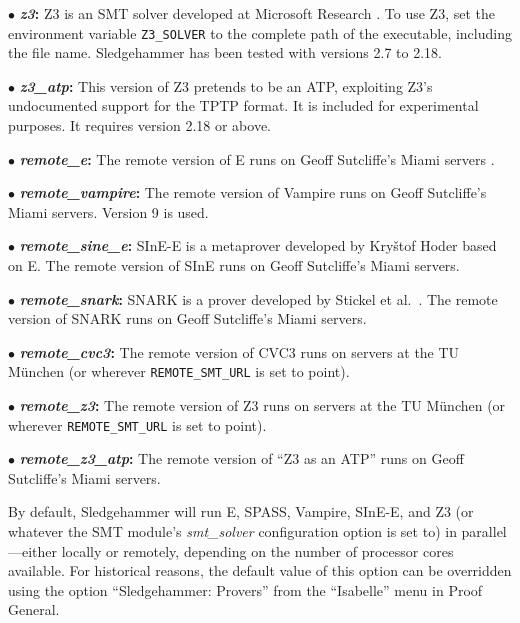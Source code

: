 \documentclass[a4paper,12pt]{article}
\begin{document}
\begin{enum}
\begin{enum}
\item[$\bullet$] \textbf{\textit{z3}:} Z3 is an SMT solver developed at
Microsoft Research \cite{z3}. To use Z3, set the environment variable
\texttt{Z3\_SOLVER} to the complete path of the executable, including the file
name. Sledgehammer has been tested with versions 2.7 to 2.18.

\item[$\bullet$] \textbf{\textit{z3\_atp}:} This version of Z3 pretends to be an
ATP, exploiting Z3's undocumented support for the TPTP format. It is included
for experimental purposes. It requires version 2.18 or above.

\item[$\bullet$] \textbf{\textit{remote\_e}:} The remote version of E runs
on Geoff Sutcliffe's Miami servers \cite{sutcliffe-2000}.

\item[$\bullet$] \textbf{\textit{remote\_vampire}:} The remote version of
Vampire runs on Geoff Sutcliffe's Miami servers. Version 9 is used.

\item[$\bullet$] \textbf{\textit{remote\_sine\_e}:} SInE-E is a metaprover
developed by Kry\v stof Hoder \cite{sine} based on E. The remote version of
SInE runs on Geoff Sutcliffe's Miami servers.

\item[$\bullet$] \textbf{\textit{remote\_snark}:} SNARK is a prover
developed by Stickel et al.\ \cite{snark}. The remote version of
SNARK runs on Geoff Sutcliffe's Miami servers.

\item[$\bullet$] \textbf{\textit{remote\_cvc3}:} The remote version of CVC3 runs
on servers at the TU M\"unchen (or wherever \texttt{REMOTE\_SMT\_URL} is set to
point).

\item[$\bullet$] \textbf{\textit{remote\_z3}:} The remote version of Z3 runs on
servers at the TU M\"unchen (or wherever \texttt{REMOTE\_SMT\_URL} is set to
point).

\item[$\bullet$] \textbf{\textit{remote\_z3\_atp}:} The remote version of ``Z3
as an ATP'' runs on Geoff Sutcliffe's Miami servers.
\end{enum}

By default, Sledgehammer will run E, SPASS, Vampire, SInE-E, and Z3 (or whatever
the SMT module's \textit{smt\_solver} configuration option is set to) in
parallel---either locally or remotely, depending on the number of processor
cores available. For historical reasons, the default value of this option can be
overridden using the option ``Sledgehammer: Provers'' from the ``Isabelle'' menu
in Proof General.


\end{enum}
\end{document}
